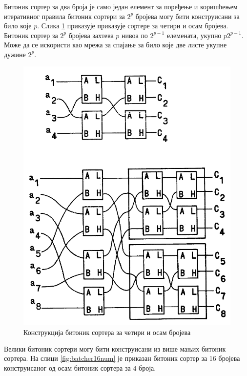 \documentclass[12pt, a4paper]{article}
\theoremstyle{definition}
\begin{document}
Битоник сортер за два броја је само један елемент за поређење и коришћењем итеративног правила битоник сортери за $2^p$ бројева могу бити конструисани за било које $p$. Слика \ref{fig:batcher4_8num} приказује приказује сортере за четири и осам бројева. Битоник сортер за $2^p$ бројева захтева $p$ нивоа по $2^{p-1}$ елемената, укупно $p2^{p-1}$. Може да се искористи као мрежа за спајање за било које две листе укупне дужине $2^p$.

\begin{figure}[H]
  \centering
      \includegraphics[scale=0.3]{slike/batcher4_8num}
  \caption{Конструкција битоник сортера за четири и осам бројева}
  \label{fig:batcher4_8num}
\end{figure}

Велики битоник сортери могу бити конструисани из више мањих битоник сортера. На слици \ref{fig:batcher16num} је приказан битоник сортер за 16 бројева конструисаног од осам битоник сортера за 4 броја.
\end{document}
